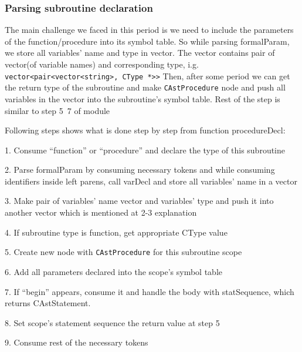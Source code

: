 \documentclass[12pt]{article}
\begin{document}
\subsubsection*{Parsing subroutine declaration}

The main challenge we faced in this period is we need to include the parameters of the function/procedure into its symbol table.
So while parsing formalParam, we store all variables’ name and type in vector. The vector contains pair of vector(of variable names) and corresponding type, 
i.g. \texttt{vector<pair<vector<string>, CType *>>}
Then, after some period we can get the return type of the subroutine and make \texttt{CAstProcedure} node and push all variables in the vector into the subroutine’s symbol table. 
Rest of the step is similar to step 5~7 of module

\begin{MyIndentedList}
    \item Following steps shows what is done step by step from function procedureDecl:
    \begin{MyIndentedList}
        \item 1.	Consume “function” or “procedure” and declare the type of this subroutine
        \item 2.	Parse formalParam by consuming necessary tokens and while consuming identifiers inside left parens, call varDecl and store all variables’ name in a vector
        \item 3.	Make pair of variables’ name vector and variables’ type and push it into another vector which is mentioned at 2-3 explanation
        \item 4.	If subroutine type is function, get appropriate CType value 
        \item 5.	Create new node with \texttt{CAstProcedure} for this subroutine scope
        \item 6.	Add all parameters declared into the scope’s symbol table
        \item 7.	 If “begin” appears, consume it and handle the body with statSequence, which returns CAstStatement.
        \item 8.	Set scope’s statement sequence the return value at step 5
        \item 9.	Consume rest of the necessary tokens                
    \end{MyIndentedList}
\end{MyIndentedList}
\end{document}
